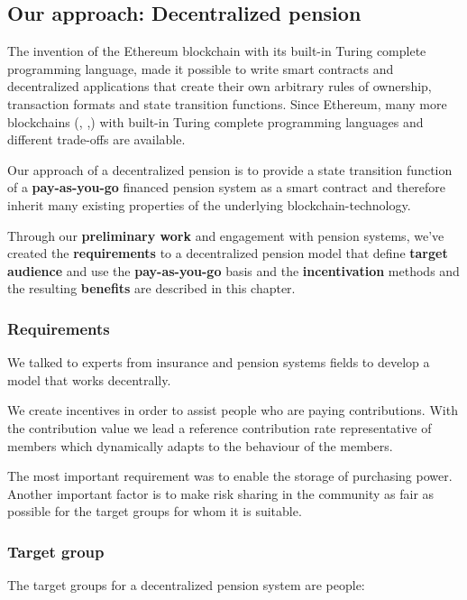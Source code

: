 \subsection{Our approach: Decentralized pension}
The invention of the Ethereum blockchain with its built-in Turing complete programming language, made it possible to write smart contracts and decentralized applications that create their own arbitrary rules of ownership, transaction formats and state transition functions. \cite{buterin2013whitepaper} Since Ethereum, many more blockchains (\cite{hyperledger}, \cite{stellar},\cite{cordano}) with built-in Turing complete programming languages and different trade-offs are available.

Our approach of a decentralized pension is to provide a state transition function of a \textbf{pay-as-you-go} financed pension system as a smart contract and therefore inherit many existing properties of the underlying blockchain-technology.

Through our \textbf{preliminary work} and engagement with pension systems, we've created the \textbf{requirements} to a decentralized pension model that define \textbf{target audience} and use the \textbf{pay-as-you-go} basis and the \textbf{ incentivation} methods and the resulting \textbf{benefits} are described in this chapter.

\subsubsection{Requirements}
We talked to experts from insurance and pension systems fields to develop a model that works decentrally.

We create incentives in order to assist people who are paying contributions. With the contribution value we lead a reference contribution rate representative of members which dynamically adapts to the behaviour of the members.

The most important requirement was to enable the storage of purchasing power. Another important factor is to make risk sharing in the community as fair as possible for the target groups for whom it is suitable.

\subsubsection{Target group}
The target groups for a decentralized pension system are people:

